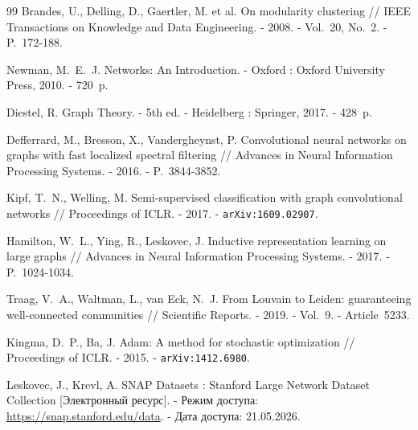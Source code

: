 \documentclass[14pt,a4paper]{extarticle}
\begin{document}
\begin{thebibliography}{99}
Brandes, U., Delling, D., Gaertler, M. et al. On modularity clustering // IEEE Transactions on Knowledge and Data Engineering. - 2008. - Vol.~20, No.~2. - P.~172-188.

Newman, M.~E.~J. Networks: An Introduction. - Oxford : Oxford University Press, 2010. - 720~p.

Diestel, R. Graph Theory. - 5th ed. - Heidelberg : Springer, 2017. - 428~p.

Defferrard, M., Bresson, X., Vandergheynst, P. Convolutional neural networks on graphs with fast localized spectral filtering // Advances in Neural Information Processing Systems. - 2016. - P.~3844-3852.

Kipf, T.~N., Welling, M. Semi-supervised classification with graph convolutional networks // Proceedings of ICLR. - 2017. - \texttt{arXiv:1609.02907}.

Hamilton, W.~L., Ying, R., Leskovec, J. Inductive representation learning on large graphs // Advances in Neural Information Processing Systems. - 2017. - P.~1024-1034.

Traag, V.~A., Waltman, L., van Eck, N.~J. From Louvain to Leiden: guaranteeing well-connected communities // Scientific Reports. - 2019. - Vol.~9. - Article~5233.

Kingma, D.~P., Ba, J. Adam: A method for stochastic optimization // Proceedings of ICLR. - 2015. - \texttt{arXiv:1412.6980}.

Leskovec, J., Krevl, A. SNAP Datasets : Stanford Large Network Dataset Collection [Электронный ресурс]. - Режим доступа: \url{https://snap.stanford.edu/data}. - Дата доступа: 21.05.2026.

\end{thebibliography}
\end{document}
